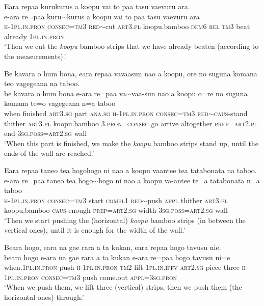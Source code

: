 \ea\label{ex:text14-29}
Eara repaa kurukurus a koopu vai to paa tasu vaevuru ara.\\
\gll e-ara	re=paa	kuru{$\sim$}kurus	a	koopu	vai	to	paa	tasu	vaevuru	ara\\
     \textsc{h}-1\textsc{pl}.\textsc{in}.\textsc{pron}	\textsc{consec}=\textsc{tm}3	\textsc{red}{$\sim$}cut	\textsc{art}3.\textsc{pl}	koopu.bamboo	\textsc{dem}6	\textsc{rel}	\textsc{tm}3	beat	already	1\textsc{pl}.\textsc{in}.\textsc{pron}\\
\glt `Then we cut the \textit{koopu} bamboo strips that we have already beaten (according to the measurements).'
\z

\ea\label{ex:text14-30}
Be kavara o hum bona, eara repaa vavaasun nao a koopu, ore no suguna komana teo vagegeana na taboo.\\
\gll be	kavara	o	hum	bona	e-ara	re=paa	va{$\sim$}vaa-sun	nao	a	koopu	o=re	no	suguna	komana	te=o	vagegeana	n=a	taboo\\
     when	finished	\textsc{art}3.\textsc{sg}	part	\textsc{ana}.\textsc{sg}	\textsc{h}-1\textsc{pl}.\textsc{in}.\textsc{pron}	\textsc{consec}=\textsc{tm}3	\textsc{red}{$\sim$}\textsc{caus}-stand	thither	\textsc{art}3.\textsc{pl}	koopu.bamboo	3.\textsc{pron}=\textsc{consec}	go	arrive	altogether	\textsc{prep}=\textsc{art}2.\textsc{pl}	end	3\textsc{sg}.\textsc{poss}=\textsc{art}2.\textsc{sg}	wall\\
\glt `When this part is finished, we make the \textit{koopu} bamboo strips stand up, until the ends of the wall are reached.'
\z

\ea\label{ex:text14-31}
Eara repaa taneo tea hogohogo ni nao a koopu vaantee tea tatabonata na taboo.\\
\gll e-ara	re=paa	taneo	tea	hogo{$\sim$}hogo	ni	nao	a	koopu	va-antee	te=a	tatabonata	n=a	taboo\\
     \textsc{h}-1\textsc{pl}.\textsc{in}.\textsc{pron}	\textsc{consec}=\textsc{tm}3	start	\textsc{compl}1	\textsc{red}{$\sim$}push	\textsc{appl}	thither	\textsc{art}3.\textsc{pl}	koopu.bamboo	\textsc{caus}-enough	\textsc{prep}=\textsc{art}2.\textsc{sg}	width	3\textsc{sg}.\textsc{poss}=\textsc{art}2.\textsc{sg}	wall\\
\glt `Then we start pushing the (horizontal) \textit{koopu} bamboo strips (in between the vertical ones), until it is enough for the width of the wall.'
\z

\ea\label{ex:text14-32}
Beara hogo, eara na gae rara a ta kukan, eara repaa hogo tavusu nie.\\
\gll beara	hogo	e-ara	na	gae	rara	a	ta	kukan	e-ara	re=paa	hogo	tavusu	ni=e\\
     when.1\textsc{pl}.\textsc{in}.\textsc{pron}	push	\textsc{h}-1\textsc{pl}.\textsc{in}.\textsc{pron}	\textsc{tm}2	lift	1\textsc{pl}.\textsc{in}.\textsc{ipfv}	\textsc{art}2.\textsc{sg}	piece	three	\textsc{h}-1\textsc{pl}.\textsc{in}.\textsc{pron}	\textsc{consec}=\textsc{tm}3	push	come.out	\textsc{appl}=3\textsc{sg}.\textsc{pron}\\
\glt `When we push them, we lift three (vertical) strips, then we push them (the horizontal ones) through.'
\z

